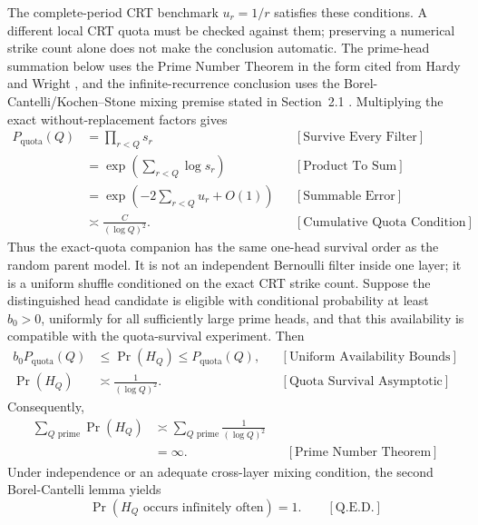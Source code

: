 The complete-period CRT benchmark $u_r=1/r$ satisfies these conditions. A different local CRT quota must be checked against them; preserving a numerical strike count alone does not make the conclusion automatic.
The prime-head summation below uses the Prime Number Theorem in the form
cited from Hardy and Wright \cite{hardywright2008}, and the
infinite-recurrence conclusion uses the Borel-Cantelli/Kochen--Stone
mixing premise stated in Section~2.1 \cite{kochenstone1964}.
Multiplying the exact without-replacement factors gives
\begin{equation*}
\begin{aligned}
P_{\mathrm{quota}}(Q)
&=\prod_{r < Q}s_r
&&[\text{Survive Every Filter}]\\
&=\exp\left(\sum_{r < Q}\log s_r\right)
&&[\text{Product To Sum}]\\
&=\exp\left(-2\sum_{r < Q}u_r+O(1)\right)
&&[\text{Summable Error}]\\
&\asymp\frac{C}{(\log Q)^2}.
&&[\text{Cumulative Quota Condition}]
\end{aligned}
\end{equation*}
Thus the exact-quota companion has the same one-head survival order as the random parent model. It is not an independent Bernoulli filter inside one layer; it is a uniform shuffle conditioned on the exact CRT strike count.
Suppose the distinguished head candidate is eligible with conditional probability at least $b_0 > 0$, uniformly for all sufficiently large prime heads, and that this availability is compatible with the quota-survival experiment. Then
\begin{equation*}
\begin{aligned}
b_0P_{\mathrm{quota}}(Q)
&\le\Pr(H_Q)\le P_{\mathrm{quota}}(Q),
&&[\text{Uniform Availability Bounds}]\\
\Pr(H_Q)
&\asymp\frac{1}{(\log Q)^2}.
&&[\text{Quota Survival Asymptotic}]
\end{aligned}
\end{equation*}
Consequently,
\begin{equation*}
\begin{aligned}
\sum_{Q\text{ prime}}\Pr(H_Q)
&\asymp
\sum_{Q\text{ prime}}\frac{1}{(\log Q)^2}\\
&=\infty.
&&[\text{Prime Number Theorem}]
\end{aligned}
\end{equation*}
Under independence or an adequate cross-layer mixing condition, the second Borel-Cantelli lemma yields
\begin{equation*}
\Pr(H_Q\text{ occurs infinitely often})=1.
\qquad[\text{Q.E.D.}]
\end{equation*}
